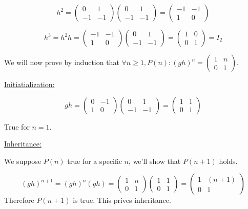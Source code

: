 \documentclass[12pt, letterpaper, twoside]{report}
\begin{document}
$$
h^2 = \begin{pmatrix} 0 & 1 \\ -1 & -1 \end{pmatrix} \begin{pmatrix} 0 & 1 \\ -1 & -1 \end{pmatrix} 
	= \begin{pmatrix} -1 & -1 \\ 1 & 0 \end{pmatrix}
$$

$$
h^3 = h^2 h
    = \begin{pmatrix} -1 & -1 \\ 1 & 0 \end{pmatrix} \begin{pmatrix} 0 & 1 \\ -1 & -1 \end{pmatrix}
	= \begin{pmatrix} 1 & 0 \\ 0 & 1 \end{pmatrix}
	= I_2
$$


We will now prove by induction that $\forall n \geq 1, P(n): (gh)^n = \begin{pmatrix} 1 & n \\ 0 & 1 \end{pmatrix}$.

\underline{Initiatialization:}

$$
gh = \begin{pmatrix} 0 & -1 \\ 1 & 0 \end{pmatrix} \begin{pmatrix} 0 & 1 \\ -1 & -1 \end{pmatrix}
   = \begin{pmatrix} 1 & 1 \\ 0 & 1 \end{pmatrix}
$$

True for $n = 1$.

\underline{Inheritance:}

We suppose $P(n)$ true for a specific $n$, we'll show that $P(n+1)$ holds.

$$
(gh)^{n+1} = (gh)^n(gh)
       = \begin{pmatrix} 1 & n \\ 0 & 1 \end{pmatrix} \begin{pmatrix} 1 & 1 \\ 0 & 1 \end{pmatrix}
	   = \begin{pmatrix} 1 & (n+1) \\ 0 & 1 \end{pmatrix}
$$
Therefore $P(n+1)$ is true. This prives inheritance.
\end{document}
